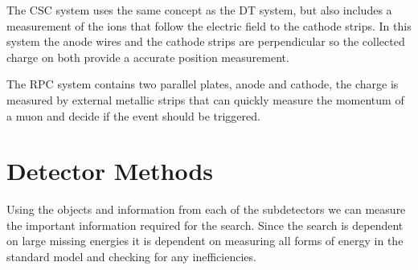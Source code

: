 The CSC system uses the same concept as the DT system, but also includes a measurement of the ions that follow the electric field to the cathode strips. In this system the anode wires and the cathode strips are perpendicular so the collected charge on both provide a accurate position measurement. 

The RPC system contains two parallel plates, anode and cathode, the charge is measured by external metallic strips that can quickly measure the momentum of a muon and decide if the event should be triggered.

\section{Detector Methods}
\label{sec:DetMethods}

Using the objects and information from each of the subdetectors we can measure the important information required for the \st{} search. Since the search is dependent on large missing energies it is dependent on measuring all forms of energy in the standard model and checking for any inefficiencies. 

